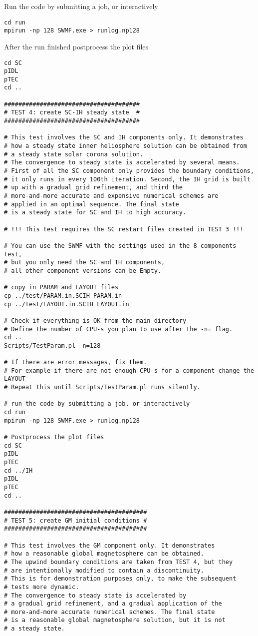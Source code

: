 Run the code by submitting a job, or interactively
\begin{verbatim}
cd run
mpirun -np 128 SWMF.exe > runlog.np128
\end{verbatim}

After the run finished postprocess the plot files
\begin{verbatim}
cd SC
pIDL
pTEC
cd ..

######################################
# TEST 4: create SC-IH steady state  #
######################################

# This test involves the SC and IH components only. It demonstrates
# how a steady state inner heliosphere solution can be obtained from
# a steady state solar corona solution.
# The convergence to steady state is accelerated by several means.
# First of all the SC component only provides the boundary conditions,
# it only runs in every 100th iteration. Second, the IH grid is built
# up with a gradual grid refinement, and third the 
# more-and-more accurate and expensive numerical schemes are 
# applied in an optimal sequence. The final state
# is a steady state for SC and IH to high accuracy. 

# !!! This test requires the SC restart files created in TEST 3 !!!

# You can use the SWMF with the settings used in the 8 components test, 
# but you only need the SC and IH components,
# all other component versions can be Empty.

# copy in PARAM and LAYOUT files
cp ../test/PARAM.in.SCIH PARAM.in
cp ../test/LAYOUT.in.SCIH LAYOUT.in

# Check if everything is OK from the main directory
# Define the number of CPU-s you plan to use after the -n= flag.
cd ..
Scripts/TestParam.pl -n=128

# If there are error messages, fix them. 
# For example if there are not enough CPU-s for a component change the LAYOUT
# Repeat this until Scripts/TestParam.pl runs silently.

# run the code by submitting a job, or interactively
cd run
mpirun -np 128 SWMF.exe > runlog.np128

# Postprocess the plot files
cd SC
pIDL
pTEC
cd ../IH
pIDL
pTEC
cd ..

########################################
# TEST 5: create GM initial conditions #
########################################

# This test involves the GM component only. It demonstrates
# how a reasonable global magnetosphere can be obtained.
# The upwind boundary conditions are taken from TEST 4, but they
# are intentionally modified to contain a discontinuity.
# This is for demonstration purposes only, to make the subsequent
# tests more dynamic.
# The convergence to steady state is accelerated by 
# a gradual grid refinement, and a gradual application of the
# more-and-more accurate numerical schemes. The final state
# is a reasonable global magnetosphere solution, but it is not 
# a steady state.


\end{verbatim}
